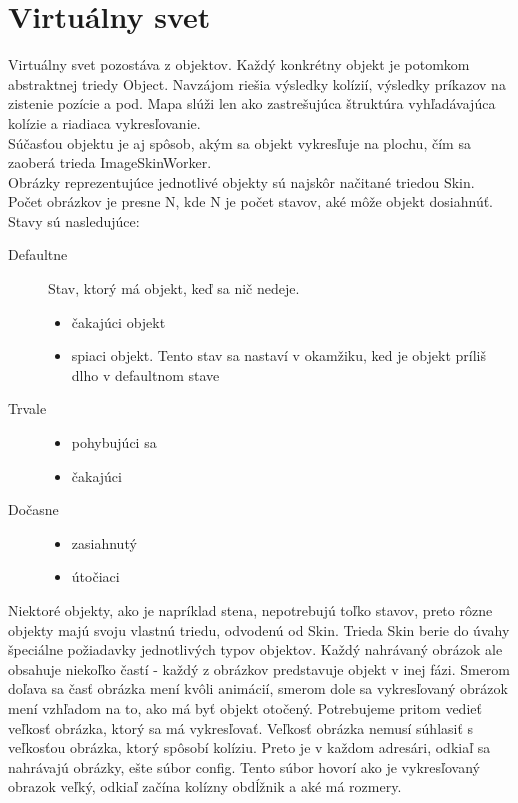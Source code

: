 \section{Virtuálny svet}
Virtuálny svet pozostáva z objektov. Každý konkrétny objekt je potomkom abstraktnej triedy Object. Navzájom riešia výsledky kolízií, výsledky príkazov na zistenie pozície a pod. Mapa slúži len ako zastrešujúca štruktúra vyhľadávajúca kolízie a riadiaca vykresľovanie.\\
Súčasťou objektu je aj spôsob, akým sa objekt vykresľuje na plochu, čím sa zaoberá trieda ImageSkinWorker. \\
Obrázky reprezentujúce jednotlivé objekty sú najskôr načitané triedou Skin. Počet obrázkov je presne N, kde N je počet stavov, aké môže objekt dosiahnúť. Stavy sú nasledujúce:
\begin{description}
\item [Defaultne] \hfill \newline
Stav, ktorý má objekt, keď sa nič nedeje.
\begin{itemize}
\item čakajúci objekt
\item spiaci objekt. Tento stav sa nastaví v okamžiku, ked je objekt príliš dlho v defaultnom stave
\end{itemize}
\item [Trvale]
\begin{itemize}
\item pohybujúci sa
\item čakajúci
\end{itemize}
\item [Dočasne]
\begin{itemize}
\item zasiahnutý
\item útočiaci
\end{itemize}
\end{description}
Niektoré objekty, ako je napríklad stena, nepotrebujú toľko stavov, preto rôzne objekty majú svoju vlastnú triedu, odvodenú od Skin. Trieda Skin berie do úvahy špeciálne požiadavky jednotlivých typov objektov. Každý nahrávaný obrázok ale obsahuje niekoľko častí - každý z obrázkov predstavuje objekt v inej fázi. Smerom doľava sa časť obrázka mení kvôli animácií, smerom dole sa vykresľovaný obrázok mení vzhľadom na to, ako má byť objekt otočený. Potrebujeme pritom vedieť veľkosť obrázka, ktorý sa má vykresľovať. Veľkosť obrázka nemusí súhlasiť s veľkosťou obrázka, ktorý spôsobí kolíziu. Preto je v každom adresári, odkiaľ sa nahrávajú obrázky, ešte súbor config. Tento súbor hovorí ako je vykresľovaný obrazok veľký, odkiaľ začína kolízny obdĺžnik a aké má rozmery. 
